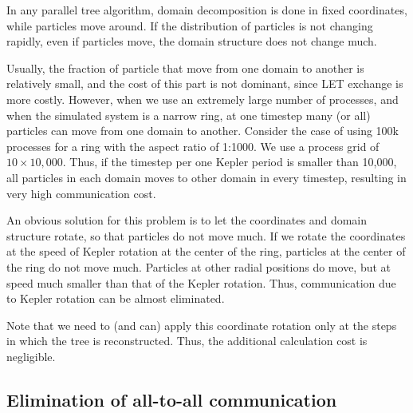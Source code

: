 \documentclass[oribibl]{llncs}
\begin{document}
In any parallel tree algorithm, domain decomposition is done in fixed
coordinates, while particles move around. If the distribution of
particles is not changing rapidly, even if particles move, the domain
structure does not change much.

Usually, the fraction of particle that move from one domain to
another is relatively small, and the cost of this part is not
dominant, since LET exchange is more costly. However, when we use
an extremely large number of processes, and when the simulated system is
a narrow ring, at one timestep many (or all) particles can move from
one domain to another. Consider the case of using 100k processes for a
ring with the aspect ratio of 1:1000. We use a process grid of
$10\times 10,000$. Thus, if the timestep per one Kepler period is
smaller than 10,000, all particles in each domain moves to other
domain in every timestep, resulting in very high communication cost.

An obvious solution for this problem is to let the coordinates and domain
structure rotate, so that particles do not move much. If we rotate the
coordinates at the speed of Kepler rotation at the center of the ring,
particles at the center of the ring do not move much. Particles at
other radial positions do move, but at speed much smaller than
that of the Kepler rotation. Thus, communication due to Kepler
rotation can be almost eliminated.

Note that we need to (and can) apply this coordinate rotation only at
the steps in which the tree is reconstructed. Thus, the additional
calculation cost is negligible.

\subsection{Elimination of all-to-all communication}
\label{subsec:exlet}


\end{document}
